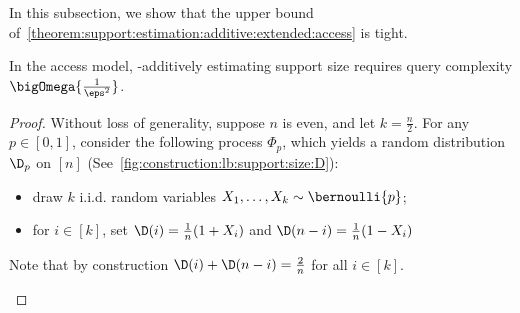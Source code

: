 In this subsection, we show that the upper bound of~\cref{theorem:support:estimation:additive:extended:access} is tight.

\begin{theorem}\label{theorem:tolerant:tester:support:size:lb} In the \pdfsamp access model, \eps-additively estimating support size requires query complexity $\bigOmega{\frac{1}{\eps^2}}$.
\end{theorem}
 \begin{proof}
Without loss of generality, suppose $n$ is even, and let $k=\frac{n}{2}$. For any $p\in[0,1]$, consider the following process $\Phi_p$, which yields a random distribution $\D_p$ on $[n]$ (See~\cref{fig:construction:lb:support:size:D}):
\begin{itemize}
  \item draw $k$ i.i.d. random variables $X_1,\dots, X_k\sim\bernoulli{p}$;
  \item for $i\in[k] $, set $\D(i)=\frac{1}{n}(1+X_i)$ and  $\D(n-i)=\frac{1}{n}(1-X_i)$
\end{itemize}
Note that by construction $\D(i)+\D(n-i)=\frac{2}{n}$ for all $i\in[k]$.

  \begin{figure}[!ht]\centering
\end{figure}
\end{proof}
